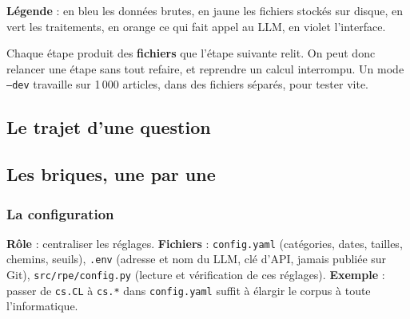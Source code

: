 \documentclass[11pt,a4paper]{article}
\newcommand{\code}[1]{\texttt{#1}}
\begin{document}
\textbf{Légende} : en bleu les données brutes, en jaune les fichiers stockés sur disque, en
vert les traitements, en orange ce qui fait appel au LLM, en violet l'interface.

\begin{attention}
Chaque étape produit des \textbf{fichiers} que l'étape suivante relit. On peut donc
relancer une étape sans tout refaire, et reprendre un calcul interrompu. Un mode
\code{--dev} travaille sur 1\,000 articles, dans des fichiers séparés, pour tester vite.
\end{attention}

\subsection{Le trajet d'une question}

\begin{center}
\end{center}

\subsection{Les briques, une par une}

\subsubsection{La configuration}
\textbf{Rôle} : centraliser les réglages. \textbf{Fichiers} : \code{config.yaml} (catégories,
dates, tailles, chemins, seuils), \code{.env} (adresse et nom du LLM, clé d'API, jamais
publiée sur Git), \code{src/rpe/config.py} (lecture et vérification de ces réglages).
\textbf{Exemple} : passer de \code{cs.CL} à \code{cs.*} dans \code{config.yaml} suffit à
élargir le corpus à toute l'informatique.
\end{document}

